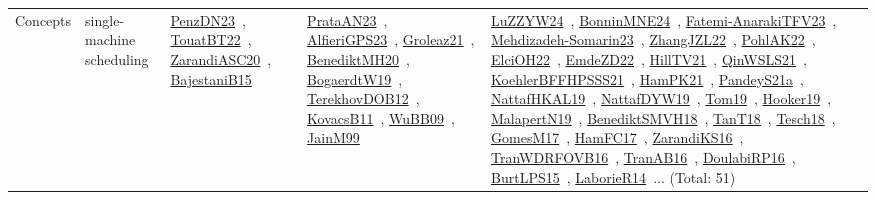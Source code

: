 {\begin{longtable}{lp{3cm}>{\raggedright\arraybackslash}p{6cm}>{\raggedright\arraybackslash}p{6cm}>{\raggedright\arraybackslash}p{8cm}}
Concepts & single-machine scheduling & \href{../works/PenzDN23.pdf}{PenzDN23}~\cite{PenzDN23}, \href{../works/TouatBT22.pdf}{TouatBT22}~\cite{TouatBT22}, \href{../works/ZarandiASC20.pdf}{ZarandiASC20}~\cite{ZarandiASC20}, \href{../works/BajestaniB15.pdf}{BajestaniB15}~\cite{BajestaniB15} & \href{../works/PrataAN23.pdf}{PrataAN23}~\cite{PrataAN23}, \href{../works/AlfieriGPS23.pdf}{AlfieriGPS23}~\cite{AlfieriGPS23}, \href{../works/Groleaz21.pdf}{Groleaz21}~\cite{Groleaz21}, \href{../works/BenediktMH20.pdf}{BenediktMH20}~\cite{BenediktMH20}, \href{../works/BogaerdtW19.pdf}{BogaerdtW19}~\cite{BogaerdtW19}, \href{../works/TerekhovDOB12.pdf}{TerekhovDOB12}~\cite{TerekhovDOB12}, \href{../works/KovacsB11.pdf}{KovacsB11}~\cite{KovacsB11}, \href{../works/WuBB09.pdf}{WuBB09}~\cite{WuBB09}, \href{../works/JainM99.pdf}{JainM99}~\cite{JainM99} & \href{../works/LuZZYW24.pdf}{LuZZYW24}~\cite{LuZZYW24}, \href{../works/BonninMNE24.pdf}{BonninMNE24}~\cite{BonninMNE24}, \href{../works/Fatemi-AnarakiTFV23.pdf}{Fatemi-AnarakiTFV23}~\cite{Fatemi-AnarakiTFV23}, \href{../works/Mehdizadeh-Somarin23.pdf}{Mehdizadeh-Somarin23}~\cite{Mehdizadeh-Somarin23}, \href{../works/ZhangJZL22.pdf}{ZhangJZL22}~\cite{ZhangJZL22}, \href{../works/PohlAK22.pdf}{PohlAK22}~\cite{PohlAK22}, \href{../works/ElciOH22.pdf}{ElciOH22}~\cite{ElciOH22}, \href{../works/EmdeZD22.pdf}{EmdeZD22}~\cite{EmdeZD22}, \href{../works/HillTV21.pdf}{HillTV21}~\cite{HillTV21}, \href{../works/QinWSLS21.pdf}{QinWSLS21}~\cite{QinWSLS21}, \href{../works/KoehlerBFFHPSSS21.pdf}{KoehlerBFFHPSSS21}~\cite{KoehlerBFFHPSSS21}, \href{../works/HamPK21.pdf}{HamPK21}~\cite{HamPK21}, \href{../works/PandeyS21a.pdf}{PandeyS21a}~\cite{PandeyS21a}, \href{../works/NattafHKAL19.pdf}{NattafHKAL19}~\cite{NattafHKAL19}, \href{../works/NattafDYW19.pdf}{NattafDYW19}~\cite{NattafDYW19}, \href{../works/Tom19.pdf}{Tom19}~\cite{Tom19}, \href{../works/Hooker19.pdf}{Hooker19}~\cite{Hooker19}, \href{../works/MalapertN19.pdf}{MalapertN19}~\cite{MalapertN19}, \href{../works/BenediktSMVH18.pdf}{BenediktSMVH18}~\cite{BenediktSMVH18}, \href{../works/TanT18.pdf}{TanT18}~\cite{TanT18}, \href{../works/Tesch18.pdf}{Tesch18}~\cite{Tesch18}, \href{../works/GomesM17.pdf}{GomesM17}~\cite{GomesM17}, \href{../works/HamFC17.pdf}{HamFC17}~\cite{HamFC17}, \href{../works/ZarandiKS16.pdf}{ZarandiKS16}~\cite{ZarandiKS16}, \href{../works/TranWDRFOVB16.pdf}{TranWDRFOVB16}~\cite{TranWDRFOVB16}, \href{../works/TranAB16.pdf}{TranAB16}~\cite{TranAB16}, \href{../works/DoulabiRP16.pdf}{DoulabiRP16}~\cite{DoulabiRP16}, \href{../works/BurtLPS15.pdf}{BurtLPS15}~\cite{BurtLPS15}, \href{../works/LaborieR14.pdf}{LaborieR14}~\cite{LaborieR14}... (Total: 51)\\

\end{longtable}}
